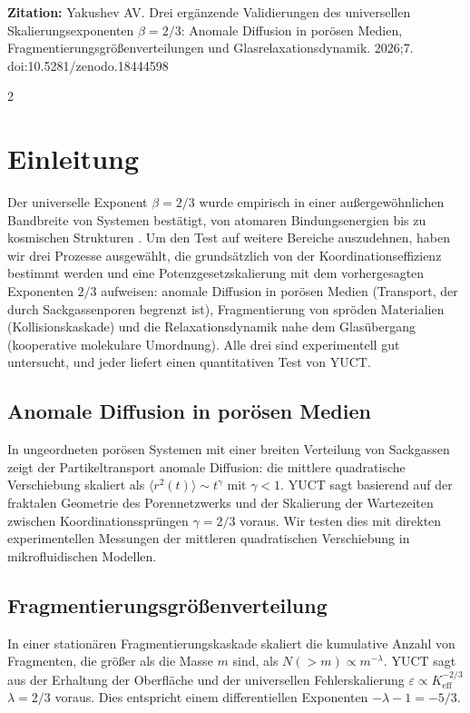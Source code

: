 \documentclass[11pt,a4paper]{article}
\newcommand{\eps}{\varepsilon}
\newcommand{\Keff}{K_{\mathrm{eff}}}
\newcommand{\betaf}{\beta}
\begin{document}
	\vspace{0.1cm}
	\noindent
	{\color{darkblue}\textbf{Zitation:}} Yakushev AV. Drei ergänzende Validierungen des universellen Skalierungsexponenten \(\beta = 2/3\): Anomale Diffusion in porösen Medien, Fragmentierungsgrößenverteilungen und Glasrelaxationsdynamik. 2026;7. doi:10.5281/zenodo.18444598
	
	\vspace{0.4cm}
	\vspace*{-\baselineskip}
	\begin{multicols}{2}
		
		\section{Einleitung}
		
		Der universelle Exponent \(\betaf = 2/3\) wurde empirisch in einer außergewöhnlichen Bandbreite von Systemen bestätigt, von atomaren Bindungsenergien bis zu kosmischen Strukturen \cite{AppendixY, AppendixL, AppendixC, AppendixG}. Um den Test auf weitere Bereiche auszudehnen, haben wir drei Prozesse ausgewählt, die grundsätzlich von der Koordinationseffizienz bestimmt werden und eine Potenzgesetzskalierung mit dem vorhergesagten Exponenten \(2/3\) aufweisen: anomale Diffusion in porösen Medien (Transport, der durch Sackgassenporen begrenzt ist), Fragmentierung von spröden Materialien (Kollisionskaskade) und die Relaxationsdynamik nahe dem Glasübergang (kooperative molekulare Umordnung). Alle drei sind experimentell gut untersucht, und jeder liefert einen quantitativen Test von YUCT.
		
		\subsection{Anomale Diffusion in porösen Medien}
		In ungeordneten porösen Systemen mit einer breiten Verteilung von Sackgassen zeigt der Partikeltransport anomale Diffusion: die mittlere quadratische Verschiebung skaliert als \(\langle r^2(t) \rangle \sim t^{\gamma}\) mit \(\gamma < 1\). YUCT sagt basierend auf der fraktalen Geometrie des Porennetzwerks und der Skalierung der Wartezeiten zwischen Koordinationssprüngen \(\gamma = 2/3\) voraus. Wir testen dies mit direkten experimentellen Messungen der mittleren quadratischen Verschiebung in mikrofluidischen Modellen.
		
		\subsection{Fragmentierungsgrößenverteilung}
		In einer stationären Fragmentierungskaskade skaliert die kumulative Anzahl von Fragmenten, die größer als die Masse \(m\) sind, als \(N(>m) \propto m^{-\lambda}\). YUCT sagt aus der Erhaltung der Oberfläche und der universellen Fehlerskalierung \(\eps \propto \Keff^{-2/3}\) \(\lambda = 2/3\) voraus. Dies entspricht einem differentiellen Exponenten \(-\lambda - 1 = -5/3\).
		

\end{multicols}
\end{document}
